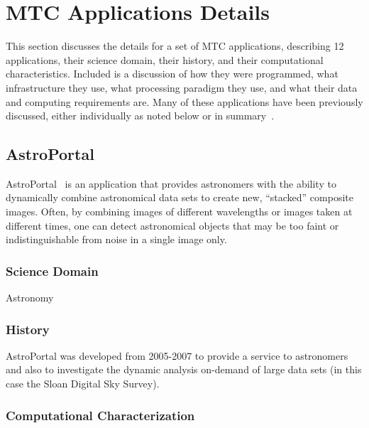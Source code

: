\documentclass[10pt,letterpaper]{article}
\begin{document}
\section{MTC Applications Details\label{sec:apps}}
This section discusses the details for a set of MTC applications, describing 12
applications, their science domain, their history, and their computational characteristics.
Included is a discussion of how they were programmed, what infrastructure they use, what processing
paradigm they use, and what  their data and computing requirements are.  Many of these
applications have been previously
discussed, either individually as noted below or in summary~\cite{swift-ieee09}.

\subsection{AstroPortal}


AstroPortal~\cite{raicu06astroportal}
is an application that provides astronomers with the ability to
dynamically combine astronomical data sets to create new, ``stacked'' composite images.
Often, by combining images of different wavelengths or images  taken at different times, one
can detect astronomical objects that may be too faint or
indistinguishable from noise in a single image only.


\subsubsection{Science Domain} Astronomy

\subsubsection{History}
AstroPortal was developed from 2005-2007 to provide a service to
astronomers and also to investigate the dynamic analysis on-demand of large data
sets (in this case the Sloan Digital Sky Survey).

\subsubsection{Computational Characterization}
\end{document}
